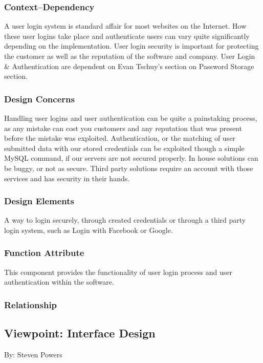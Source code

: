 \documentclass[letterpaper, 10pt, draftclsnofoot, compsoc, onecolumn]{IEEEtran}
\begin{document}
\subsubsection{Context--Dependency}
{\noindent A user login system is standard affair for most websites on the Internet.
How these user logins take place and authenticate users can vary quite
significantly depending on the implementation.
User login security is important for protecting the customer as well as
the reputation of the software and company. User Login \& Authentication
are dependent on Evan Tschuy's section on Password Storage section. \par}

\subsubsection{Design Concerns}
{\noindent Handling user logins and user authentication can be quite a painstaking process,
as any mistake can cost you customers and any reputation that was present
before the mistake was exploited. Authentication, or the matching of user submitted
data with our stored credentials can be exploited though a simple MySQL command,
if our servers are not secured properly. In house solutions can be buggy, or not as secure.
Third party solutions require an account with those services and has security in their hands. \par}

\subsubsection{Design Elements}
{\noindent A way to login securely, through created credentials or through a
third party login system, such as Login with Facebook or Google.  \par}

\subsubsection{Function Attribute}
{\noindent This component provides the functionality of user login process
and user authentication within the software.\par}

\subsubsection{Relationship}



\subsection{Viewpoint: Interface Design}
{\noindent By: Steven Powers \par}
\end{document}
